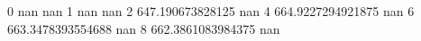 0 nan nan
1 nan nan
2 647.190673828125 nan
4 664.9227294921875 nan
6 663.3478393554688 nan
8 662.3861083984375 nan
